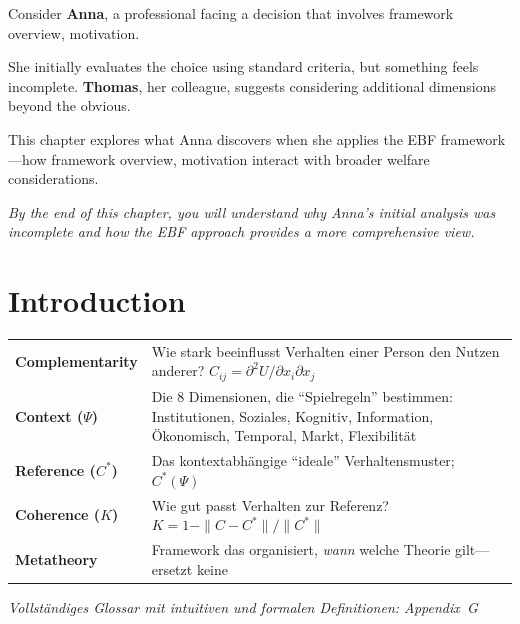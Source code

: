 \begin{tcolorbox}[
    colback=blue!5!white,
    colframe=blue!75!black,
    title={\textbf{Intuition: A Motivating Example}},
    fonttitle=\bfseries
]
Consider \textbf{Anna}, a professional facing a decision that involves framework overview, motivation.

She initially evaluates the choice using standard criteria, but something feels incomplete.
\textbf{Thomas}, her colleague, suggests considering additional dimensions beyond the obvious.

This chapter explores what Anna discovers when she applies the EBF framework---how
framework overview, motivation interact with broader welfare considerations.

\medskip
\textit{By the end of this chapter, you will understand why Anna's initial analysis
was incomplete and how the EBF approach provides a more comprehensive view.}
\end{tcolorbox}



\section{Introduction}
\label{sec:introduction}

\begin{tcolorbox}[colback=gray!5!white, colframe=gray!75!black,
    title=\textbf{Begriffe in diesem Kapitel}]

\small
\begin{tabular}{@{}p{2.8cm}p{10cm}@{}}
\textbf{Complementarity} & Wie stark beeinflusst Verhalten einer Person den Nutzen anderer? $C_{ij} = \partial^2 U/\partial x_i \partial x_j$ \\[3pt]
\textbf{Context ($\Psi$)} & Die 8 Dimensionen, die ``Spielregeln'' bestimmen: Institutionen, Soziales, Kognitiv, Information, Ökonomisch, Temporal, Markt, Flexibilität \\[3pt]
\textbf{Reference ($C^*$)} & Das kontextabhängige ``ideale'' Verhaltensmuster; $C^*(\Psi)$ \\[3pt]
\textbf{Coherence ($K$)} & Wie gut passt Verhalten zur Referenz? $K = 1 - \|C-C^*\|/\|C^*\|$ \\[3pt]
\textbf{Metatheory} & Framework das organisiert, \emph{wann} welche Theorie gilt---ersetzt keine \\
\end{tabular}

\vspace{3pt}
\textit{Vollständiges Glossar mit intuitiven und formalen Definitionen: Appendix~G}
\end{tcolorbox}

